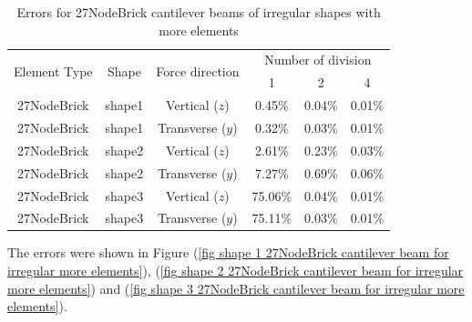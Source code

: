 \documentclass[fleqn,11pt]{article}
\begin{document}
\begin{table}[H]
  \centering
  \caption{Errors for 27NodeBrick cantilever beams of irregular shapes with more elements}
  \label{table Errors for 27NodeBrick cantilever beams of irregular shapes with more elements}
\begin{tabular}{|c|c|c|c|c|c|}
\hline
\multirow{2}{*}{Element Type} & \multirow{2}{*}{Shape}  & \multirow{2}{*}{Force direction}  & \multicolumn{3}{|c|}{Number of division} \\  \cline{4-6}
                        &        &                  &  1 &  2 &  4  \\ \hline
27NodeBrick   & shape1      & Vertical ($z$)   & 0.45\%  & 0.04\% & 0.01\%    \\ \hline
27NodeBrick   & shape1      & Transverse ($y$) & 0.32\%  & 0.03\% & 0.01\%    \\ \hline
27NodeBrick   & shape2      & Vertical ($z$)   & 2.61\%  & 0.23\% & 0.03\%    \\ \hline
27NodeBrick   & shape2      & Transverse ($y$) & 7.27\%  & 0.69\% & 0.06\%    \\ \hline
27NodeBrick   & shape3      & Vertical ($z$)   & 75.06\% & 0.04\% & 0.01\%    \\ \hline
27NodeBrick   & shape3      & Transverse ($y$) & 75.11\% & 0.03\% & 0.01\%    \\
\hline
\end{tabular}
\end{table}


The errors were shown in Figure (\ref{fig shape 1 27NodeBrick cantilever beam for irregular more elements}), (\ref{fig shape 2 27NodeBrick cantilever beam for irregular more elements}) and (\ref{fig shape 3 27NodeBrick cantilever beam for irregular more elements}). 
\end{document}
